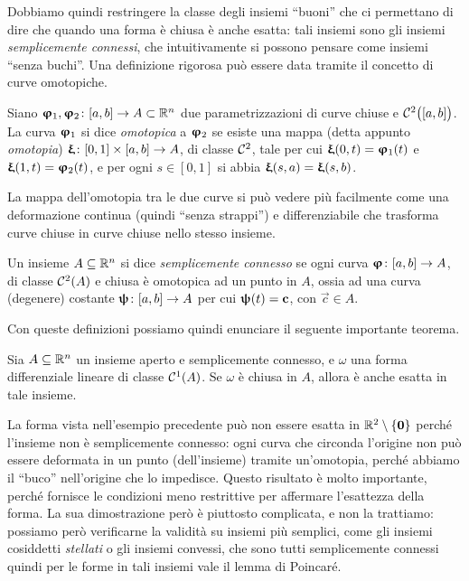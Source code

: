 Dobbiamo quindi restringere la classe degli insiemi ``buoni'' che ci permettano di dire che quando una forma è chiusa è anche esatta: tali insiemi sono gli insiemi \emph{semplicemente connessi}, che intuitivamente si possono pensare come insiemi ``senza buchi''.
Una definizione rigorosa può essere data tramite il concetto di curve omotopiche.
\begin{definizione} \label{d:curva-omotopica}
	Siano $\bm{\upvarphi}_1,\bm{\upvarphi}_2\colon[a,b]\to A\subset\mathbb{R}^n$ due parametrizzazioni di curve chiuse e $\mathcal{C}^{{2}}\big([a,b]\big)$.
	La curva $\bm{\upvarphi}_1$ si dice \emph{omotopica} a $\bm{\upvarphi}_2$ se esiste una mappa (detta appunto \emph{omotopia}) $\bm{\upxi}\colon[0,1]\times[a,b]\to A$, di classe $\mathcal{C}^{{2}}$, tale per cui $\bm{\upxi}(0,t)=\bm{\upvarphi}_1(t)$ e $\bm{\upxi}(1,t)=\bm{\upvarphi}_2(t)$, e per ogni $s\in[0,1]$ si abbia $\bm{\upxi}(s,a)=\bm{\upxi}(s,b)$.
\end{definizione}
La mappa dell'omotopia tra le due curve si può vedere più facilmente come una deformazione continua (quindi ``senza strappi'') e differenziabile che trasforma curve chiuse in curve chiuse nello stesso insieme.
\begin{definizione} \label{d:insieme-semplicemente-connesso}
	Un insieme $A\subseteq\mathbb{R}^n$ si dice \emph{semplicemente connesso} se ogni curva $\bm{\upvarphi}\colon[a,b]\to A$, di classe $\mathcal{C}^{{2}}(A)$ e chiusa è omotopica ad un punto in $A$, ossia ad una curva (degenere) costante $\bm{\uppsi}\colon[a,b]\to A$ per cui $\bm{\uppsi}(t)=\mathbf{c}$, con $\vec c\in A$.
\end{definizione}
Con queste definizioni possiamo quindi enunciare il seguente importante teorema.
\begin{teorema} \label{t:poincare}
	Sia $A\subseteq\mathbb{R}^n$ un insieme aperto e semplicemente connesso, e $\omega$ una forma differenziale lineare di classe $\mathcal{C}^{{1}}(A)$.
	Se $\omega$ è chiusa in $A$, allora è anche esatta in tale insieme.
\end{teorema}
La forma vista nell'esempio precedente può non essere esatta in $\mathbb{R}^2\setminus\{\mathbf{0}\}$ perch\'e l'insieme non è semplicemente connesso: ogni curva che circonda l'origine non può essere deformata in un punto (dell'insieme) tramite un'omotopia, perch\'e abbiamo il ``buco'' nell'origine che lo impedisce.
Questo risultato è molto importante, perch\'e fornisce le condizioni meno restrittive per affermare l'esattezza della forma.
La sua dimostrazione però è piuttosto complicata, e non la trattiamo: possiamo però verificarne la validità su insiemi più semplici, come gli insiemi cosiddetti \emph{stellati} o gli insiemi convessi, che sono tutti semplicemente connessi quindi per le forme in tali insiemi vale il lemma di Poincar\'e.

